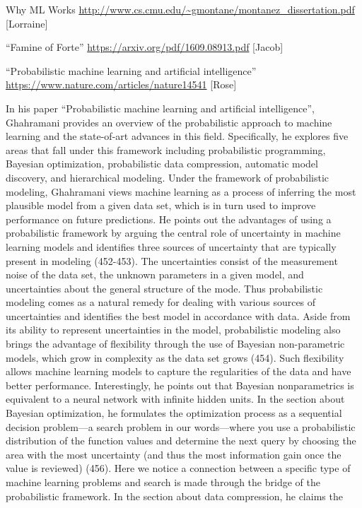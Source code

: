 \documentclass[12pt]{article}
\begin{document}
Why ML Works
\url{http://www.cs.cmu.edu/~gmontane/montanez_dissertation.pdf} [Lorraine]

“Famine of Forte”
\url{https://arxiv.org/pdf/1609.08913.pdf} [Jacob]

“Probabilistic machine learning and artificial intelligence”
\url{https://www.nature.com/articles/nature14541} [Rose]

In his paper “Probabilistic machine learning and artificial intelligence”, Ghahramani provides an
overview of the probabilistic approach to machine learning and the state-of-art advances in
this field. Specifically, he explores five areas that fall under this framework including
probabilistic programming, Bayesian optimization, probabilistic data compression, automatic
model discovery, and hierarchical modeling. Under the framework of probabilistic modeling,
Ghahramani views machine learning as a process of inferring the most plausible model from a
given data set, which is in turn used to improve performance on future predictions. He points
out the advantages of using a probabilistic framework by arguing the central role of uncertainty
in machine learning models and identifies three sources of uncertainty that are typically present
in modeling (452-453). The uncertainties consist of the measurement noise of the data set, the
unknown parameters in a given model, and uncertainties about the general structure of the
mode. Thus probabilistic modeling comes as a natural remedy for dealing with various sources
of uncertainties and identifies the best model in accordance with data. Aside from its ability to
represent uncertainties in the model, probabilistic modeling also brings the advantage of
flexibility through the use of Bayesian non-parametric models, which grow in complexity as the
data set grows (454). Such flexibility allows machine learning models to capture the regularities
of the data and have better performance. Interestingly, he points out that Bayesian nonparametrics is equivalent to a neural network with infinite hidden units. In the section about
Bayesian optimization, he formulates the optimization process as a sequential decision
problem—a search problem in our words—where you use a probabilistic distribution of the
function values and determine the next query by choosing the area with the most uncertainty
(and thus the most information gain once the value is reviewed) (456). Here we notice a
connection between a specific type of machine learning problems and search is made through
the bridge of the probabilistic framework. In the section about data compression, he claims the
\end{document}
